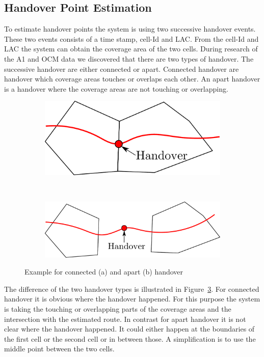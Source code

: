 \documentclass[master,english]{hgbthesis}
\begin{document}
\subsection{Handover Point Estimation}
To estimate handover points the system is using two successive handover events. These two events consists of a time stamp, cell-Id and LAC. From the cell-Id and LAC the system can obtain the coverage area of the two cells. During research of the A1 and OCM data we discovered that there are two types of handover. The successive handover are either connected or apart. Connected handover are handover which coverage areas touches or overlaps each other. An apart handover is a handover where the coverage areas are not touching or overlapping.
\begin{figure}
	\centering
	\begin{subfigure}[b]{0.4\textwidth}
		\includegraphics[width=\textwidth]{./images/handover_together}
		\caption{}
		\label{fig:handovertogether}
	\end{subfigure}%
	~ %
	\begin{subfigure}[b]{0.55\textwidth}
		\includegraphics[width=\textwidth]{./images/handover_apart}
		\caption{}
		\label{fig:handoverapart}
	\end{subfigure}
	\caption{Example for connected (a) and apart (b) handover}
	\label{fig:handovertypes}
\end{figure}
The difference of the two handover types is illustrated in Figure~\ref{fig:handovertypes}. For connected handover it is obvious where the handover happened. For this purpose the system is taking the touching or overlapping parts of the coverage areas and the intersection with the estimated route. In contrast for apart handover it is not clear where the handover happened. It could either happen at the boundaries of the first cell or the second cell or in between those. A simplification is to use the middle point between the two cells.
\end{document}
